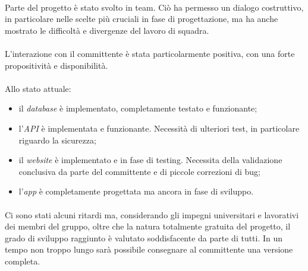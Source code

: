 \documentclass[11pt,a4paper,english]{article}
\begin{document}
\paragraph{} Parte del progetto è stato svolto in team. Ciò ha permesso un dialogo costruttivo, in particolare nelle scelte più cruciali in fase di progettazione, ma ha anche mostrato le difficoltà e divergenze del lavoro di squadra. 

\paragraph{} L'interazione con il committente è stata particolarmente positiva, con una forte propositività e disponibilità. 

\paragraph{} Allo stato attuale:
\begin{itemize}
    \item il \emph{database} è implementato, completamente testato e funzionante;
    \item l'\emph{API} è implementata e funzionante. Necessità di ulteriori test, in particolare riguardo la sicurezza;
    \item il \emph{website} è implementato e in fase di testing. Necessita della validazione conclusiva da parte del committente e di piccole correzioni di bug;  
    \item l'\emph{app} è completamente progettata ma ancora in fase di sviluppo. 
\end{itemize}

\paragraph{} Ci sono stati alcuni ritardi ma, considerando gli impegni universitari e lavorativi dei membri del gruppo, oltre che la natura totalmente gratuita del progetto, il grado di sviluppo raggiunto è valutato soddisfacente da parte di tutti. In un tempo non troppo lungo sarà possibile consegnare al committente una versione completa. 
\end{document}
